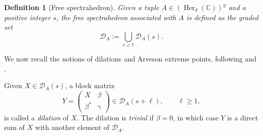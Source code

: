 \documentclass[11pt, a4paper]{article}
\theoremstyle{plain}
\newtheorem{definition}[theorem]{Definition}
\theoremstyle{definition}
\theoremstyle{remark}
\newcommand{\C}{\mathbb{C}}
\newcommand{\Her}[2][\C]{\operatorname{Her}_{#2}(#1)}
\begin{document}
\begin{definition}[Free spectrahedron]
Given a tuple \(A \in (\Her d)^g\) and a positive integer \(s\), the \emph{free spectrahedron} associated with \(A\) is defined as the graded set
\[
\mathcal{D}_A := \bigcup_{s \ge 1} \mathcal{D}_A(s).
\]
\end{definition}

We now recall the notions of dilations and Arveson extreme points,
following \cite{DDN20} and \cite{EH19}.

Given \(X \in \mathcal{D}_A(s)\), a block matrix
\[
Y =
\begin{pmatrix}
X & \beta \\
\beta^* & \gamma
\end{pmatrix}
\in \mathcal{D}_A(s+\ell),
\qquad \ell \ge 1,
\]
is called a \emph{dilation} of \(X\).
The dilation is \emph{trivial} if \(\beta = 0\), in which case \(Y\) is a direct sum of \(X\)
with another element of \(\mathcal{D}_A\).
\end{document}
